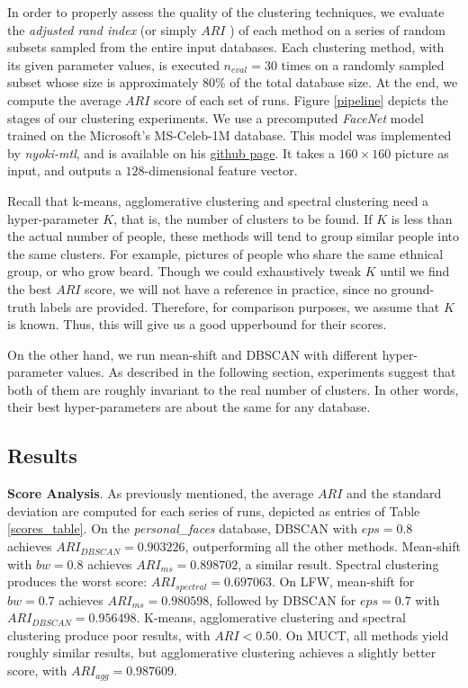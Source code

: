 \documentclass[conference]{IEEEtran}
\begin{document}
In order to properly assess the quality of the clustering techniques, we evaluate the \textit{adjusted rand index} (or simply $ARI$ \cite{??}) of each method on a series of random subsets sampled from the entire input databases.
Each clustering method, with its given parameter values, is executed $n_{eval} = 30$ times on a randomly sampled subset whose size is approximately $80\%$ of the total database size.
At the end, we compute the average $ARI$ score of each set of runs.
Figure \ref{pipeline} depicts the stages of our clustering experiments.
We use a precomputed \textit{FaceNet} model trained on the Microsoft's MS-Celeb-1M database.
This model was implemented by \textit{nyoki-mtl}, and is available on his \href{https://github.com/nyoki-mtl/keras-facenet}{github page}.
It takes a $160 \times 160$ picture as input, and outputs a $128$-dimensional feature vector.

Recall that k-means, agglomerative clustering and spectral clustering need a hyper-parameter $K$, that is, the number of clusters to be found.
If $K$ is less than the actual number of people, these methods will tend to group similar people into the same clusters.
For example, pictures of people who share the same ethnical group, or who grow beard.
Though we could exhaustively tweak $K$ until we find the best $ARI$ score, we will not have a reference in practice, since no ground-truth labels are provided.
Therefore, for comparison purposes, we assume that $K$ is known.
Thus, this will give us a good upperbound for their scores.

On the other hand, we run mean-shift and DBSCAN with different hyper-parameter values.
As described in the following section, experiments suggest that both of them are roughly invariant to the real number of clusters.
In other words, their best hyper-parameters are about the same for any database.

\subsection{Results}

\textbf{Score Analysis}. As previously mentioned, the average $ARI$ and the standard deviation are computed for each series of runs, depicted as entries of Table \ref{scores_table}.
On the \textit{personal\_faces} database, DBSCAN with $eps = 0.8$ achieves $ARI_{DBSCAN} = 0.903226$, outperforming all the other methods.
Mean-shift with $bw = 0.8$ achieves $ARI_{ms} = 0.898702$, a similar result.
Spectral clustering produces the worst score: $ARI_{spectral} = 0.697063$.
On LFW, mean-shift for $bw = 0.7$ achieves $ARI_{ms} = 0.980598$, followed by DBSCAN for $eps = 0.7$ with $ARI_{DBSCAN} = 0.956498$.
K-means, agglomerative clustering and spectral clustering produce poor results, with $ARI < 0.50$.
On MUCT, all methods yield roughly similar results, but agglomerative clustering achieves a slightly better score, with $ARI_{agg} = 0.987609$.
\end{document}
